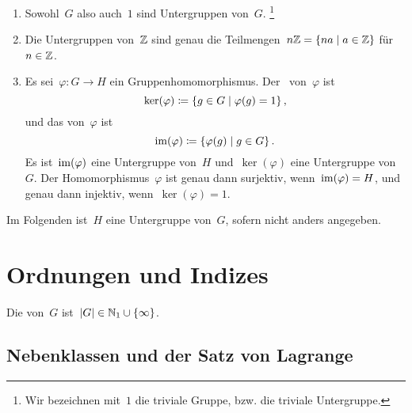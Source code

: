 \begin{example}
  \leavevmode
  \begin{enumerate}
    \item
      Sowohl~$G$ also auch~$1$ sind Untergruppen von~$G$.%
      \footnote{
        Wir bezeichnen mit~$1$ die triviale Gruppe, bzw. die triviale Untergruppe.
      }
    \item
      Die Untergruppen von~$\mathbb{Z}$ sind genau die Teilmengen~$n \Integer = \{na \suchthat a \in \Integer\}$ für~$n \in \mathbb{Z}$.
    \item
      Es sei~$\varphi \colon G \to H$ ein Gruppenhomomorphismus.
      Der~ von~$\varphi$ ist
      \[
        \ker(\varphi)
        \defined
        \{
          g \in G
        \suchthat
          \varphi(g) = 1
        \} \,,
      \]
      und das  von~$\varphi$ ist
      \[
        \im(\varphi)
        \defined
        \{
          \varphi(g)
        \suchthat
          g \in G
        \} \,.
      \]
      Es ist~$\operatorname{im}(\varphi)$ eine Untergruppe von~$H$ und~$\ker(\varphi)$ eine Untergruppe von~$G$.
      Der Homomorphismus~$\varphi$ ist genau dann surjektiv, wenn~$\operatorname{im}(\varphi) = H$, und genau dann injektiv, wenn~$\ker(\varphi) = 1$.
  \end{enumerate}
\end{example}

\begin{convention}
  Im Folgenden ist~$H$ eine Untergruppe von~$G$, sofern nicht anders angegeben.
\end{convention}





\section{Ordnungen und Indizes}

\begin{definition}
  Die  von~$G$ ist~$\lvert G\rvert \in \mathbb{N}_{1} \cup \{ \infty \}$.
\end{definition}



\subsection{Nebenklassen und der Satz von Lagrange}

